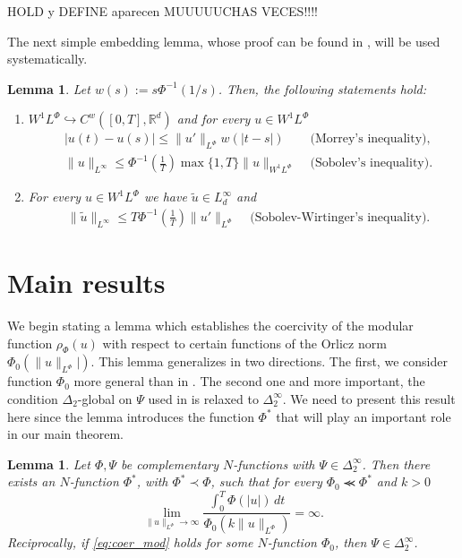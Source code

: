 \documentclass[twoside]{article}
\newtheorem{lem}[thm]{Lemma}
\theoremstyle{remark}
\newcommand{\orlnor}{\|_{L^{\Phi}}}
\newcommand{\lphi}{L^{\Phi}}
\newcommand{\wphi}{W^{1}\lphi}
\newcommand{\sobnor}{\|_{W^{1}\lphi}}
\newcommand{\rr}{\mathbb{R}}
\renewcommand{\leq}{\leqslant}
\begin{document}
HOLD y DEFINE aparecen MUUUUUCHAS VECES!!!!



The next simple  embedding lemma, whose proof can be found in \cite{ABGMS2015}, will be used systematically.




\begin{lem}\label{inclusion orlicz} Let  $w(s):= s\Phi^{-1}(1/s)$. Then, the following statements hold:
\begin{enumerate}
\item\label{inclusion orlicz_item1} $\wphi\hookrightarrow C^w([0,T],\rr^d) $ and for every $u\in\wphi$
\begin{align}
 &\left|u(t)-u(s) \right| \leq  \|u'\orlnor w(| t-s|)&\text{  (Morrey's inequality),}\label{in-sob-cont}
\\
& \|u\|_{L^{\infty}} \leq\Phi^{-1}\left(\frac{1}{T}\right)\max\{1,T\}\|u\sobnor&\text{  (Sobolev's inequality).}\label{sobolev}
\end{align}
\item For every $u\in\wphi$ we have $\widetilde{u}\in L^{\infty}_d$ and
\begin{align}
& \|\widetilde{u}\|_{L^{\infty}} \leq T\Phi^{-1}\left(\frac{1}{T}\right)\|u'\orlnor&
\text{  (Sobolev-Wirtinger's inequality).}\label{wirtinger}
\end{align}




\end{enumerate}
\end{lem}


\section{Main results}

We begin stating a lemma which establishes the coercivity of the modular function $\rho_{\Phi}(u)$ with respect to certain functions of the Orlicz norm $\Phi_0(\|u\orlnor|)$. This lemma generalizes \cite[Lemma 5.2]{ABGMS2015} in two directions. The first, we consider function $\Phi_0$ more general than in  \cite[Lemma 5.2]{ABGMS2015}. The second one and more important, the condition $\Delta_2$-global on $\Psi$ used in \cite[Lemma 5.2]{ABGMS2015} is relaxed to $\Delta_2^{\infty}$. We need to present this result here since the lemma introduces the function $\Phi^*$ that will play an important role in our main theorem.

\begin{lem}\label{lem_coer}
Let $\Phi,\Psi$ be complementary $N$-functions with $\Psi \in \Delta_2^{\infty}$. 
Then there exists an $N$-function $\Phi^*$, with $\Phi^*\prec\Phi$, such that  for every $\Phi_0\llcurly\Phi^*$ and $k>0$
\begin{equation}\label{eq:coer_mod}
\lim\limits_{\|u\orlnor\to \infty}
\frac{\int_0^T \Phi(|u|)\,dt}{\Phi_0(k\|u\orlnor)}=\infty.
\end{equation}
Reciprocally, if  \eqref{eq:coer_mod} holds for some $N$-function $\Phi_0$,  then $\Psi\in\Delta_2^{\infty}$.
\end{lem}
\end{document}
